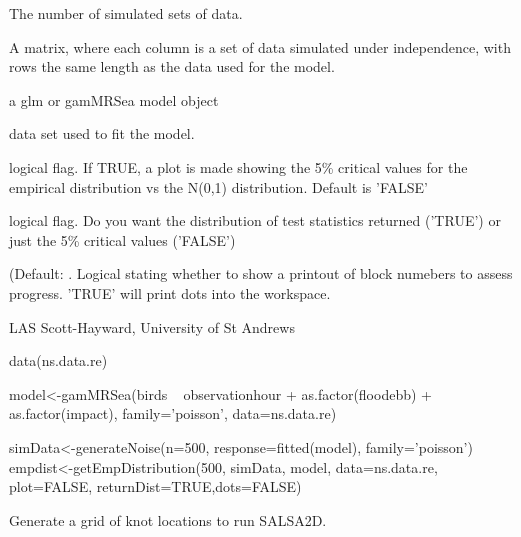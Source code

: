 \documentclass[a4paper]{book}
\begin{document}
\begin{Arguments}
\begin{ldescription}
\item[\code{n.sim}] The number of simulated sets of data.

\item[\code{simData}] A matrix, where each column is a set of data simulated under independence, with rows the same length as the data used for the model.

\item[\code{model}] a glm or gamMRSea model object

\item[\code{data}] data set used to fit the model.

\item[\code{plot}] logical flag. If TRUE, a plot is made showing the 5\% critical values for the empirical distribution vs the N(0,1) distribution. Default is 'FALSE'

\item[\code{returnDist}] logical flag.  Do you want the distribution of test statistics returned ('TRUE') or just the 5\% critical values ('FALSE')

\item[\code{dots}] (Default: . Logical stating whether to show a printout of block numebers to assess progress. 'TRUE' will print dots into the workspace.
\end{ldescription}
\end{Arguments}
%
\begin{Author}\relax
LAS Scott-Hayward, University of St Andrews
\end{Author}
%
\begin{Examples}
\begin{ExampleCode}
data(ns.data.re)

model<-gamMRSea(birds ~ observationhour + as.factor(floodebb) + as.factor(impact),  
              family='poisson', data=ns.data.re)

simData<-generateNoise(n=500, response=fitted(model), family='poisson')
empdist<-getEmpDistribution(500, simData, model, data=ns.data.re, plot=FALSE, 
                returnDist=TRUE,dots=FALSE)

\end{ExampleCode}
\end{Examples}
%
\begin{Description}\relax
Generate a grid of knot locations to run SALSA2D.
\end{Description}
\end{document}
